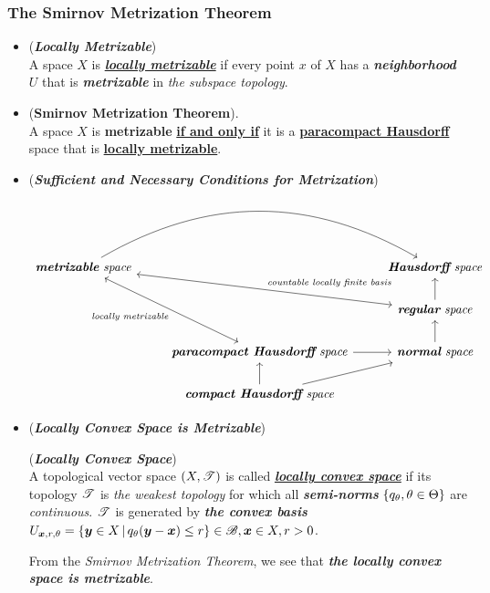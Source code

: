 \documentclass[11pt]{article}
\begin{document}
\subsubsection{The Smirnov Metrization Theorem}
\begin{itemize}
\item \begin{definition} (\emph{\textbf{Locally Metrizable}})\\
A space $X$ is \underline{\emph{\textbf{locally metrizable}}} if every point $x$ of $X$ has a \emph{\textbf{neighborhood}} $U$ that is \emph{\textbf{metrizable}} in \emph{the subspace topology}.
\end{definition}

\item \begin{theorem} (\textbf{Smirnov Metrization Theorem}).  \citep{munkres2000topology}\\
A space $X$ is \textbf{metrizable} \underline{\textbf{if and only if}} it is a \underline{\textbf{paracompact Hausdorff}} space that is \underline{\textbf{locally metrizable}}.
\end{theorem}

\item 
\begin{remark} (\emph{\textbf{Sufficient and Necessary Conditions for Metrization}})
\[
  \begin{tikzcd}
   \text{\emph{\textbf{metrizable} space}} \arrow[bend left]{rr}{} &  &  \text{\emph{\textbf{Hausdorff} space}} \\
   & &  \arrow[ull, leftrightarrow, swap,  "\text{\emph{countable locally finite basis}}"]   \text{\emph{\textbf{regular} space}}  \arrow{u}{} \\
   & \text{\emph{\textbf{paracompact Hausdorff} space}} \arrow{r}{}  \arrow[uul, leftrightarrow,   "\text{\emph{locally metrizable}}"]   &  \text{\emph{\textbf{normal} space}} \arrow{u}{} \\
   & \text{\emph{\textbf{compact Hausdorff} space}}  \arrow{u}{} \arrow{ru}{} & 
  \end{tikzcd}
\] 
\end{remark}

\item \begin{example} (\emph{\textbf{Locally Convex Space is Metrizable}})
 \begin{definition} (\emph{\textbf{Locally Convex Space}})\\
A topological vector space $(X, {\mathscr T})$ is called \underline{\emph{\textbf{locally convex space}}} if its topology ${\mathscr T}$ is \emph{the weakest topology} for which all \emph{\textbf{semi-norms}} $\left\{q_{\theta},\theta\in \Theta\right\}$ are \emph{continuous}. ${\mathscr T}$ is generated by \emph{\textbf{the convex basis}} $U_{\boldsymbol{x},r,\theta} = \left\{\boldsymbol{y}\in X\,|\, q_{\theta}(\boldsymbol{y}-\boldsymbol{x}) \le r \right\}\in {\mathscr B}, \boldsymbol{x}\in X, r>0$. 
\end{definition}

From the \emph{Smirnov Metrization Theorem}, we see that \emph{\textbf{the locally convex space is metrizable}}.
\end{example}
\end{itemize}
\end{document}
